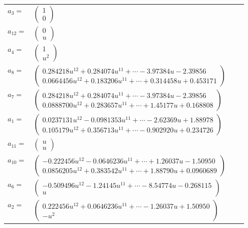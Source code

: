 \documentclass[1p]{elsarticle_modified}
\theoremstyle{definition}
\begin{document}
\begin{tabular}{m{7pt} m{180pt} m{7pt} m{180pt} }
\flushright $a_{3}=$&$\begin{pmatrix}1\\0\end{pmatrix}$ \\
\flushright $a_{12}=$&$\begin{pmatrix}0\\u\end{pmatrix}$ \\
\flushright $a_{4}=$&$\begin{pmatrix}1\\u^2\end{pmatrix}$ \\
\flushright $a_{8}=$&$\begin{pmatrix}0.284218 u^{12}+0.284074 u^{11}+\cdots-3.97384 u-2.39856\\0.0664456 u^{12}+0.183206 u^{11}+\cdots+0.314458 u+0.453171\end{pmatrix}$ \\
\flushright $a_{7}=$&$\begin{pmatrix}0.284218 u^{12}+0.284074 u^{11}+\cdots-3.97384 u-2.39856\\0.0888700 u^{12}+0.283657 u^{11}+\cdots+1.45177 u+0.168808\end{pmatrix}$ \\
\flushright $a_{1}=$&$\begin{pmatrix}0.0237131 u^{12}-0.0981353 u^{11}+\cdots-2.62369 u+1.88978\\0.105179 u^{12}+0.356713 u^{11}+\cdots-0.902920 u+0.234726\end{pmatrix}$ \\
\flushright $a_{11}=$&$\begin{pmatrix}u\\u\end{pmatrix}$ \\
\flushright $a_{10}=$&$\begin{pmatrix}-0.222456 u^{12}-0.0646236 u^{11}+\cdots+1.26037 u-1.50950\\0.0856205 u^{12}+0.383542 u^{11}+\cdots+1.88790 u+0.0960689\end{pmatrix}$ \\
\flushright $a_{6}=$&$\begin{pmatrix}-0.509496 u^{12}-1.24145 u^{11}+\cdots-8.54774 u-0.268115\\u\end{pmatrix}$ \\
\flushright $a_{2}=$&$\begin{pmatrix}0.222456 u^{12}+0.0646236 u^{11}+\cdots-1.26037 u+1.50950\\- u^2\end{pmatrix}$ \\

\end{tabular}
\end{document}
